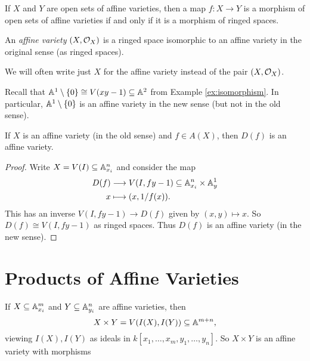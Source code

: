 \begin{remark}
  If $X$ and $Y$ are open sets of
  affine varieties, then a map
  $f : X \to Y$ is a morphism
  of open sets of affine varieties
  if and only if
  it is a morphism of ringed spaces.
\end{remark}

\begin{definition}
  An \emph{affine variety} $(X, \mathcal{O}_X)$
  is a ringed space isomorphic to an
  affine variety in the original sense
  (as ringed spaces).
\end{definition}

\begin{remark}
  We will often write just $X$ for
  the affine variety instead of
  the pair $(X, \mathcal{O}_X)$.
\end{remark}

\begin{example}
  Recall that
  $\mathbb{A}^1 \setminus \{0\} \cong V(xy - 1) \subseteq \mathbb{A}^2$
  from Example \ref{ex:isomorphism}.
  In particular,
  $\mathbb{A}^1 \setminus \{0\}$
  is an affine variety in the new sense
  (but not in the old sense).
\end{example}

\begin{prop}
  If $X$ is an affine variety (in the
  old sense) and $f \in A(X)$, then
  $D(f)$ is an affine variety.
\end{prop}

\begin{proof}
  Write $X = V(I) \subseteq \mathbb{A}^n_{x_i}$
  and consider the map
  \begin{align*}
    D(f)
    &\longrightarrow V(I, fy - 1) \subseteq \mathbb{A}^n_{x_i} \times \mathbb{A}^1_y \\
    x &\longmapsto (x, 1 / f(x)).
  \end{align*}
  This has an inverse
  $V(I, fy - 1) \to D(f)$ given by
  $(x, y) \mapsto x$. So
  $D(f) \cong V(I, fy - 1)$ as ringed spaces.
  Thus $D(f)$ is an affine variety
  (in the new sense).
\end{proof}

\section{Products of Affine Varieties}
\begin{remark}
  If $X \subseteq \mathbb{A}^m_{x_i}$
  and $Y \subseteq \mathbb{A}^n_{y_i}$
  are affine varieties, then
  \[
    X \times Y = V(I(X), I(Y))
    \subseteq \mathbb{A}^{m + n},
  \]
  viewing
  $I(X), I(Y)$ as ideals in
  $k[x_1, \dots, x_m, y_1, \dots, y_n]$.
  So $X \times Y$ is an affine variety with
  morphisms
  \begin{center}
  \end{center}
\end{remark}

